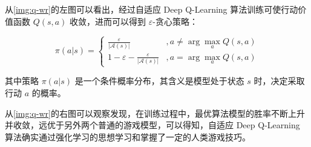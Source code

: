 从\ref{img:q-wr}的左图可以看出，经过自适应 Deep Q-Learning 算法训练可使行动价值函数 $Q(s,a)$ 收敛，进而可以得到 $\varepsilon$-贪心策略：

\begin{equation}
    \pi(a|s)=
    \begin{cases}
        \frac{\varepsilon}{|\mathcal A(s)|}&, a\neq\arg\max_aQ(s,a)\\
        1-\varepsilon-\frac{\varepsilon}{|\mathcal A(s)|}&, a=\arg\max_aQ(s,a)
    \end{cases}
\end{equation}

其中策略 $\pi(a|s)$ 是一个条件概率分布，其含义是模型处于状态 $s$ 时，决定采取行动 $a$ 的概率。

从\ref{img:q-wr}的右图可以观察发现，在训练过程中，最优算法模型的胜率不断上升并收敛，远优于另外两个普通的游戏模型，可以得知，自适应 Deep Q-Learning 算法确实通过强化学习的思想学习和掌握了一定的人类游戏技巧。

